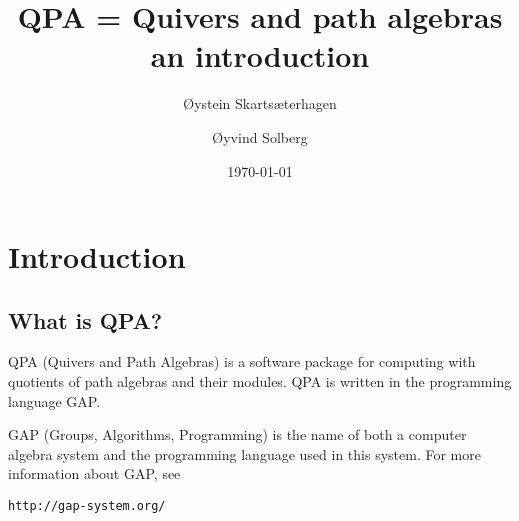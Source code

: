 \documentclass{amsart}
\theoremstyle{definition}
\theoremstyle{theoretic}
\begin{document}
\title[QPA -- an introduction]{QPA = Quivers and path algebras\\an introduction} 

\author[Skarts\ae terhagen]{\O ystein  Skarts\ae terhagen}
\address{\O ystein Skarts\ae terhagen\\
Institutt for matematiske fag\\
NTNU\\ 
N--7491 Trondheim\\ 
Norway}

\author[Solberg]{\O yvind Solberg}
\address{\O yvind Solberg\\
Institutt for matematiske fag\\
NTNU\\ 
N--7491 Trondheim\\ 
Norway}

\date{\today}


\maketitle



\section{Introduction}

\subsection{What is QPA?\nopunct}

QPA (Quivers and Path Algebras) is a software package for computing
with quotients of path algebras and their modules.  QPA is written in
the programming language GAP.

GAP (Groups, Algorithms, Programming) is the name of both a computer
algebra system and the programming language used in this system.  For
more information about GAP, see
\begin{center}
\texttt{http://gap-system.org/}
\end{center}

\end{document}
